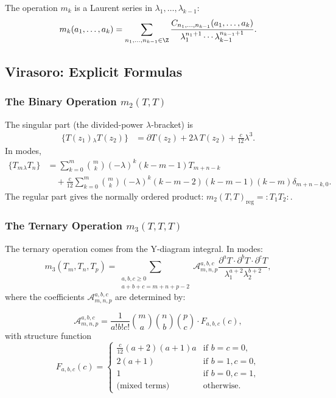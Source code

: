 The operation $m_k$ is a Laurent series in $\lambda_1, \ldots, \lambda_{k-1}$:
\begin{equation}
m_k(a_1, \ldots, a_k) = \sum_{n_1, \ldots, n_{k-1} \in \Z} \frac{C_{n_1, \ldots, n_{k-1}}(a_1, \ldots, a_k)}{\lambda_1^{n_1+1} \cdots \lambda_{k-1}^{n_{k-1}+1}}.
\end{equation}

\subsection{Virasoro: Explicit Formulas}

\subsubsection{The Binary Operation $m_2(T,T)$}

The singular part (the divided-power $\lambda$-bracket) is
\begin{align}
\{T(z_1) {}_\lambda T(z_2)\} &= \partial T(z_2) + 2\lambda\,T(z_2) + \frac{c}{12}\lambda^3.
\end{align}
In modes,
\begin{align}
\{T_m {}_\lambda T_n\} &= \sum_{k=0}^{m} \binom{m}{k} (-\lambda)^k (k-m-1) T_{m+n-k}\\
&\quad + \frac{c}{12} \sum_{k=0}^m \binom{m}{k} (-\lambda)^k (k-m-2)(k-m-1)(k-m) \delta_{m+n-k,0}.
\end{align}
The regular part gives the normally ordered product:
$m_2(T,T)_{\text{reg}} = {:}T_1 T_2{:}$.

\subsubsection{The Ternary Operation $m_3(T,T,T)$}

The ternary operation comes from the Y-diagram integral. In modes:
\begin{equation}
\label{eq:vir-m3-modes}
m_3(T_m, T_n, T_p) = \sum_{\substack{a,b,c \geq 0 \\ a+b+c = m+n+p-2}} \mathcal{A}_{m,n,p}^{a,b,c} \frac{\partial^a T \cdot \partial^b T \cdot \partial^c T}{\lambda_1^{a+2} \lambda_2^{b+2}},
\end{equation}
where the coefficients $\mathcal{A}_{m,n,p}^{a,b,c}$ are determined by:

\begin{equation}
\mathcal{A}_{m,n,p}^{a,b,c} = \frac{1}{a! b! c!} \binom{m}{a} \binom{n}{b} \binom{p}{c} \cdot F_{a,b,c}(c),
\end{equation}
with structure function
\begin{equation}
F_{a,b,c}(c) = \begin{cases}
\frac{c}{12}(a+2)(a+1)a & \text{if } b=c=0,\\
2(a+1) & \text{if } b=1, c=0,\\
1 & \text{if } b=0, c=1,\\
\text{(mixed terms)} & \text{otherwise}.
\end{cases}
\end{equation}

